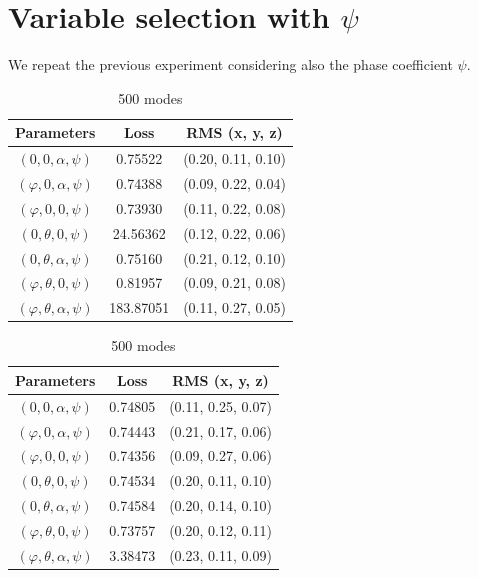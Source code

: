 \documentclass[a4paper,12pt]{article}
\theoremstyle{definition}
\begin{document}
\section{Variable selection with \(\psi\)}
We repeat the previous experiment considering also the phase coefficient \(\psi\). 

\bigskip



\begin{table}[!htb]
    \caption{Losses obtain for different parameter combination}
    \begin{subtable}{.5\linewidth}
      \centering
        \caption{250 modes}
        \begin{tabular}{ c | c | c}
        Parameters & Loss & RMS (x, y, z)\\
        \hline
        $(0,0,\alpha,\psi)$ & 0.75522 & (0.20, 0.11, 0.10)\\
        $(\varphi,0, \alpha,\psi)$ & 0.74388 & (0.09, 0.22, 0.04)\\
        $(\varphi, 0,0,\psi)$ & 0.73930 & (0.11, 0.22, 0.08)\\
        $(0, \theta, 0,\psi)$ & 24.56362 & (0.12, 0.22, 0.06)\\
        $(0,\theta, \alpha,\psi)$ & 0.75160 & (0.21, 0.12, 0.10)\\
        $(\varphi,\theta,0,\psi)$ & 0.81957 & (0.09, 0.21, 0.08)\\
        $(\varphi,\theta,\alpha,\psi)$ & 183.87051 & (0.11, 0.27, 0.05)\\
        \end{tabular}
    \end{subtable}%
    \begin{subtable}{.5\linewidth}
      \centering
        \caption{500 modes}
        \begin{tabular}{ c | c | c}
        Parameters & Loss & RMS (x, y, z)\\
        \hline
        $(0,0,\alpha,\psi)$ & 0.74805 & (0.11, 0.25, 0.07)\\
        $(\varphi,0, \alpha,\psi)$ & 0.74443 & (0.21, 0.17, 0.06)\\
        $(\varphi, 0,0,\psi)$ & 0.74356 & (0.09, 0.27, 0.06)\\
        $(0, \theta, 0,\psi)$ & 0.74534 & (0.20, 0.11, 0.10)\\
        $(0,\theta, \alpha,\psi)$ & 0.74584 & (0.20, 0.14, 0.10)\\
        $(\varphi,\theta,0,\psi)$ & 0.73757 & (0.20, 0.12, 0.11)\\
        $(\varphi,\theta,\alpha,\psi)$ &  3.38473  & (0.23, 0.11, 0.09)\\
        \end{tabular}
    \end{subtable}
\end{table}
\end{document}
